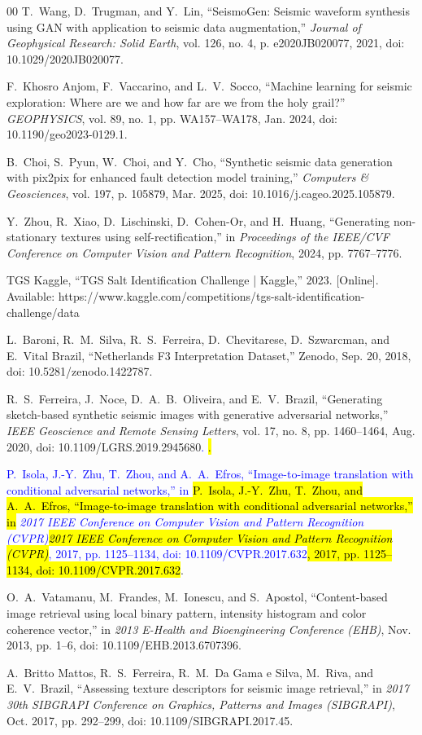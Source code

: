 \documentclass{ieeeaccess}
\providecommand{\DIFaddbegin}{} %
\providecommand{\DIFaddend}{} %
\newcommand{\DIFaddincludegraphics}[2][]{{\color{blue}\fbox{\DIFOincludegraphics[#1]{#2}}}} %
\DeclareRobustCommand{\DIFaddbegin}{\DIFOaddbegin \let\includegraphics\DIFaddincludegraphics} %
\DeclareRobustCommand{\DIFaddend}{\DIFOaddend \let\includegraphics\DIFOincludegraphics} %
\providecommand{\DIFadd}[1]{\ifmmode\textcolor{blue}{#1}\else\hl{#1}\fi}
\renewcommand{\DIFadd}[1]{\ifmmode\textcolor{blue}{#1}\else\hl{#1}\fi}
\begin{document}
\begin{thebibliography}{00}
T.~Wang, D.~Trugman, and Y.~Lin, ``SeismoGen: Seismic waveform synthesis using GAN with application to seismic data augmentation,'' \emph{Journal of Geophysical Research: Solid Earth}, vol. 126, no. 4, p. e2020JB020077, 2021, doi: 10.1029/2020JB020077.

F.~Khosro Anjom, F.~Vaccarino, and L.~V.~Socco, ``Machine learning for seismic exploration: Where are we and how far are we from the holy grail?'' \emph{GEOPHYSICS}, vol. 89, no. 1, pp. WA157--WA178, Jan. 2024, doi: 10.1190/geo2023-0129.1.

B.~Choi, S.~Pyun, W.~Choi, and Y.~Cho, ``Synthetic seismic data generation with pix2pix for enhanced fault detection model training,'' \emph{Computers \& Geosciences}, vol. 197, p. 105879, Mar. 2025, doi: 10.1016/j.cageo.2025.105879.

Y.~Zhou, R.~Xiao, D.~Lischinski, D.~Cohen-Or, and H.~Huang, ``Generating non-stationary textures using self-rectification,'' in \emph{Proceedings of the IEEE/CVF Conference on Computer Vision and Pattern Recognition}, 2024, pp. 7767--7776.

TGS Kaggle, ``TGS Salt Identification Challenge | Kaggle,'' 2023. [Online]. Available: https://www.kaggle.com/competitions/tgs-salt-identification-challenge/data

L.~Baroni, R.~M.~Silva, R.~S.~Ferreira, D.~Chevitarese, D.~Szwarcman, and E.~Vital Brazil, ``Netherlands F3 Interpretation Dataset,'' Zenodo, Sep. 20, 2018, doi: 10.5281/zenodo.1422787.

R.~S.~Ferreira, J.~Noce, D.~A.~B.~Oliveira, and E.~V.~Brazil, ``Generating sketch-based synthetic seismic images with generative adversarial networks,'' \emph{IEEE Geoscience and Remote Sensing Letters}, vol. 17, no. 8, pp. 1460--1464, Aug. 2020, doi: 10.1109/LGRS.2019.2945680\DIFaddbegin \DIFadd{.
}

\DIFadd{P.~Isola, J.-Y.~Zhu, T.~Zhou, and A.~A.~Efros, ``Image-to-image translation with conditional adversarial networks,'' in }\emph{\DIFadd{2017 IEEE Conference on Computer Vision and Pattern Recognition (CVPR)}}\DIFadd{, 2017, pp. 1125--1134, doi: 10.1109/CVPR.2017.632}\DIFaddend .

O.~A.~Vatamanu, M.~Frandes, M.~Ionescu, and S.~Apostol, ``Content-based image retrieval using local binary pattern, intensity histogram and color coherence vector,'' in \emph{2013 E-Health and Bioengineering Conference (EHB)}, Nov. 2013, pp. 1--6, doi: 10.1109/EHB.2013.6707396.

A.~Britto Mattos, R.~S.~Ferreira, R.~M.~Da Gama e Silva, M.~Riva, and E.~V.~Brazil, ``Assessing texture descriptors for seismic image retrieval,'' in \emph{2017 30th SIBGRAPI Conference on Graphics, Patterns and Images (SIBGRAPI)}, Oct. 2017, pp. 292--299, doi: 10.1109/SIBGRAPI.2017.45.

\end{thebibliography}
\end{document}
